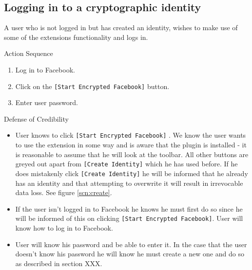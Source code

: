 \subsection{Logging in to a cryptographic identity}
A user who is not logged in but has created an identity, wishes to make use of some of the extensions functionality and logs in.

\begin{desc}

    \item[Action Sequence] \hfill
    
    \begin{enumerate}
        \item Log in to Facebook.
        \item Click on the {\tt [Start Encrypted Facebook]} button.
        \item Enter user password.
    \end{enumerate}
    
    \item[Defense of Credibility] \hfill
        \begin{itemize}
            
            \item User knows to click {\tt [Start Encrypted Facebook]} . We know the user wants to use the extension in some way and is aware that the plugin is installed - it is reasonable to assume that he will look at the toolbar. All other buttons are greyed out apart from {\tt [Create Identity]} which he has used before. If he does mistakenly click {\tt [Create Identity]} he will be informed that he already has an identity and that attempting to overwrite it will result in irrevocable data loss. See figure \ref{scn:create}.
            
            \item If the user isn't logged in to Facebook he knows he must first do so since he will be informed of this on clicking {\tt [Start Encrypted Facebook]}. User will know how to log in to Facebook.
            
            \item User will know his password and be able to enter it. In the case that the user doesn't know his password he will know he must create a new one and do so as described in section XXX.
            
        \end{itemize}
\end{desc}

